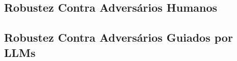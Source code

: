 \subsection{Robustez Contra Adversários Humanos}
\label{subsec:robustez_adversarios_humanos}

\subsection{Robustez Contra Adversários Guiados por LLMs}
\label{subsec:robustez_adversarios_llm}
